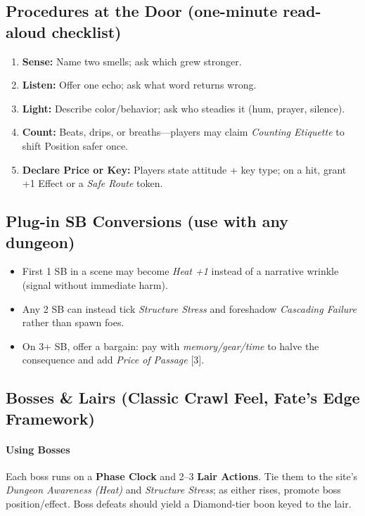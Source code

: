 \subsection*{Procedures at the Door (one-minute read-aloud checklist)}
\begin{enumerate}
  \item \textbf{Sense:} Name two smells; ask which grew stronger.
  \item \textbf{Listen:} Offer one echo; ask what word returns wrong.
  \item \textbf{Light:} Describe color/behavior; ask who steadies it (hum, prayer, silence).
  \item \textbf{Count:} Beats, drips, or breaths—players may claim \emph{Counting Etiquette} to shift Position safer once.
  \item \textbf{Declare Price or Key:} Players state attitude + key type; on a hit, grant +1 Effect or a \emph{Safe Route} token.
\end{enumerate}

\subsection*{Plug-in SB Conversions (use with any dungeon)}
\begin{itemize}
  \item First 1 SB in a scene may become \emph{Heat +1} instead of a narrative wrinkle (signal without immediate harm).
  \item Any 2 SB can instead tick \emph{Structure Stress} and foreshadow \emph{Cascading Failure} rather than spawn foes.
  \item On 3+ SB, offer a bargain: pay with \emph{memory/gear/time} to halve the consequence and add \emph{Price of Passage} [3].
\end{itemize}


\subsection*{Bosses \& Lairs (Classic Crawl Feel, Fate's Edge Framework)}
\label{sec:dungeon-bosses}

\paragraph{Using Bosses}
Each boss runs on a \textbf{Phase Clock} and 2--3 \textbf{Lair Actions}. Tie them to the site’s \emph{Dungeon Awareness (Heat)} and \emph{Structure Stress}; as either rises, promote boss position/effect. Boss defeats should yield a Diamond-tier boon keyed to the lair.

